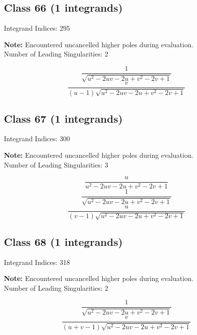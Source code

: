 \documentclass[11pt,a4paper]{article}
\begin{document}
\subsection*{Class 66 (1 integrands)}
Integrand Indices: 295

\textbf{Note:} Encountered uncancelled higher poles during evaluation.\\[1em]

Number of Leading Singularities: 2

\begin{equation}
\frac{1}{\sqrt{u^2-2 u v-2 u+v^2-2 v+1}}
\end{equation}
\begin{equation}
\frac{v}{(u-1) \sqrt{u^2-2 u v-2 u+v^2-2 v+1}}
\end{equation}


\subsection*{Class 67 (1 integrands)}
Integrand Indices: 300

\textbf{Note:} Encountered uncancelled higher poles during evaluation.\\[1em]

Number of Leading Singularities: 3

\begin{equation}
\frac{u}{u^2-2 u v-2 u+v^2-2 v+1}
\end{equation}
\begin{equation}
\frac{1}{\sqrt{u^2-2 u v-2 u+v^2-2 v+1}}
\end{equation}
\begin{equation}
\frac{u}{(v-1) \sqrt{u^2-2 u v-2 u+v^2-2 v+1}}
\end{equation}


\subsection*{Class 68 (1 integrands)}
Integrand Indices: 318

\textbf{Note:} Encountered uncancelled higher poles during evaluation.\\[1em]

Number of Leading Singularities: 2

\begin{equation}
\frac{1}{\sqrt{u^2-2 u v-2 u+v^2-2 v+1}}
\end{equation}
\begin{equation}
\frac{v}{(u+v-1) \sqrt{u^2-2 u v-2 u+v^2-2 v+1}}
\end{equation}
\end{document}
